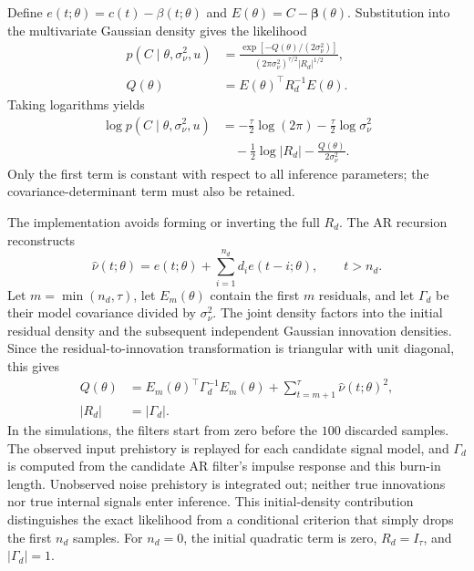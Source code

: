 \documentclass[11pt]{article}
\begin{document}
Define $e(t;\theta)=c(t)-\beta(t;\theta)$ and
$E(\theta)=C-\boldsymbol\beta(\theta)$. Substitution into the
multivariate Gaussian density gives the likelihood
\begin{align}
\label{eq:bi_likelihood}
 p(C\mid\theta,\sigma_\nu^2,u)
 &=\frac{\exp[-Q(\theta)/(2\sigma_\nu^2)]}
 {(2\pi\sigma_\nu^2)^{\tau/2}|R_d|^{1/2}},\\
\label{eq:bi_mahalanobis}
 Q(\theta)&=E(\theta)^\top R_d^{-1}E(\theta).
\end{align}
Taking logarithms yields
\begin{equation}
\label{eq:bi_log_likelihood}
 \begin{aligned}
 \log p(C\mid\theta,\sigma_\nu^2,u)
 &=-\frac{\tau}{2}\log(2\pi)
   -\frac{\tau}{2}\log\sigma_\nu^2\\
 &\quad-\frac12\log|R_d|
   -\frac{Q(\theta)}{2\sigma_\nu^2}.
 \end{aligned}
\end{equation}
Only the first term is constant with respect to all inference
parameters; the covariance-determinant term must also be retained.

The implementation avoids forming or inverting the full $R_d$.
The AR recursion reconstructs
\begin{equation}
\label{eq:bi_residuals}
 \hat\nu(t;\theta)=e(t;\theta)
       +\sum_{i=1}^{n_d}d_i e(t-i;\theta),\qquad t>n_d.
\end{equation}
Let $m=\min(n_d,\tau)$, let $E_m(\theta)$ contain the first $m$
residuals, and let $\Gamma_d$ be their model covariance divided by
$\sigma_\nu^2$. The joint density factors into the initial residual
density and the subsequent independent Gaussian innovation densities.
Since the residual-to-innovation transformation is triangular with
unit diagonal, this gives
\begin{equation}
\label{eq:bi_Q}
 \begin{aligned}
 Q(\theta)
 &=E_m(\theta)^\top\Gamma_d^{-1}E_m(\theta)
   +\sum_{t=m+1}^{\tau}\hat\nu(t;\theta)^2,\\
 |R_d|&=|\Gamma_d|.
 \end{aligned}
\end{equation}
In the simulations, the filters start from zero before the $100$
discarded samples. The observed input prehistory is replayed for each
candidate signal model, and $\Gamma_d$ is computed from the candidate
AR filter's impulse response and this burn-in length. Unobserved noise
prehistory is integrated out; neither true innovations nor true internal
signals enter inference. This initial-density contribution distinguishes
the exact likelihood from a conditional criterion that simply drops the
first $n_d$ samples. For $n_d=0$, the initial quadratic term is zero,
$R_d=I_\tau$, and $|\Gamma_d|=1$.
\end{document}
